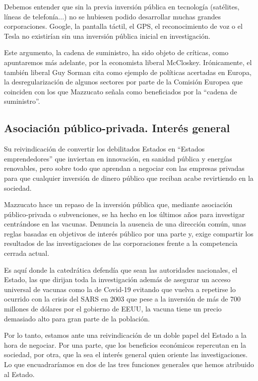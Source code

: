 \documentclass[
]{article}
\begin{document}
Debemos entender que sin la previa inversión pública en tecnología
(satélites, líneas de telefonía...) no se hubiesen podido desarrollar
muchas grandes corporaciones. Google, la pantalla táctil, el GPS, el
reconocimiento de voz o el Tesla no existirían sin una inversión pública
inicial en investigación.

Este argumento, la cadena de suministro, ha sido objeto de críticas,
como apuntaremos más adelante, por la economista liberal McCloskey.
Irónicamente, el también liberal Guy Sorman cita como ejemplo de
políticas acertadas en Europa, la desregularización de algunos sectores
por parte de la Comisión Europea que coinciden con los que Mazzucato
señala como beneficiados por la ``cadena de suministro''.

\hypertarget{asociaciuxf3n-puxfablico-privada.-interuxe9s-general}{%
\subsection{Asociación público-privada. Interés
general}\label{asociaciuxf3n-puxfablico-privada.-interuxe9s-general}}

Su reivindicación de convertir los debilitados Estados en ``Estados
emprendedores'' que inviertan en innovación, en sanidad pública y
energías renovables, pero sobre todo que aprendan a negociar con las
empresas privadas para que cualquier inversión de dinero público que
reciban acabe revirtiendo en la sociedad.

Mazzucato hace un repaso de la inversión pública que, mediante
asociación público-privada o subvenciones, se ha hecho en los últimos
años para investigar centrándose en las vacunas. Denuncia la ausencia de
una dirección común, unas reglas basadas en objetivos de interés público
por una parte y, exige compartir los resultados de las investigaciones
de las corporaciones frente a la competencia cerrada actual.

Es aquí donde la catedrática defendía que sean las autoridades
nacionales, el Estado, las que dirijan toda la investigación además de
asegurar un acceso universal de vacunas como la de Covid-19 evitando que
vuelva a repetirse lo ocurrido con la crisis del SARS en 2003 que pese a
la inversión de más de 700 millones de dólares por el gobierno de EEUU,
la vacuna tiene un precio demasiado alto para gran parte de la
población.

Por lo tanto, estamos ante una reivindicación de un doble papel del
Estado a la hora de negociar. Por una parte, que los beneficios
económicos repercutan en la sociedad, por otra, que la sea el interés
general quien oriente las investigaciones. Lo que encuadraríamos en dos
de las tres funciones generales que hemos atribuido al Estado.
\end{document}
